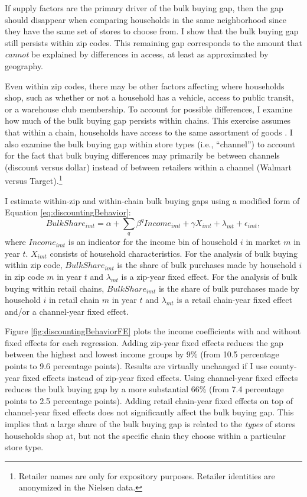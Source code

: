 \documentclass[AER]{AEA_mal}
\begin{document}
If supply factors are the primary driver of the bulk buying gap, then the gap should disappear when comparing households in the same neighborhood since they have the same set of stores to choose from. I show that the bulk buying gap still persists within zip codes. This remaining gap corresponds to the amount that \textit{cannot} be explained by differences in access, at least as approximated by geography.

Even within zip codes, there may be other factors affecting where households shop, such as whether or not a household has a vehicle, access to public transit, or a warehouse club membership. To account for possible differences, I examine how much of the bulk buying gap persists within chains. This exercise assumes that within a chain, households have access to the same assortment of goods \citep{dellavigna2019}. I also examine the bulk buying gap within store types (i.e., ``channel'') to account for the fact that bulk buying differences may primarily be between channels (discount versus dollar) instead of between retailers within a channel (Walmart versus Target).\footnote{Retailer names are only for expository purposes. Retailer identities are anonymized in the Nielsen data.}

I estimate within-zip and within-chain bulk buying gaps using a modified form of Equation \ref{eq:discountingBehavior}:
\begin{equation}
\label{eq:discountingBehaviorFE}
BulkShare_{imt} = \alpha + \sum_q \beta^q Income_{imt} + \gamma X_{imt} + \lambda_{mt} + \epsilon_{imt},
\end{equation}
where $Income_{imt}$ is an indicator for the income bin of household $i$ in market $m$ in year $t$. $X_{imt}$ consists of household characteristics. For the analysis of bulk buying within zip code, $BulkShare_{imt}$ is the share of bulk purchases made by household $i$ in zip code $m$ in year $t$ and $\lambda_{mt}$ is a zip-year fixed effect. For the analysis of bulk buying within retail chains, $BulkShare_{imt}$ is the share of bulk purchases made by household $i$ in retail chain $m$ in year $t$ and $\lambda_{mt}$ is a retail chain-year fixed effect and/or a channel-year fixed effect.

Figure \ref{fig:discountingBehaviorFE} plots the income coefficients with and without fixed effects for each regression. Adding zip-year fixed effects reduces the gap between the highest and lowest income groups by 9\% (from 10.5 percentage points to 9.6 percentage points). Results are virtually unchanged if I use county-year fixed effects instead of zip-year fixed effects. Using channel-year fixed effects reduces the bulk buying gap by a more substantial 66\% (from 7.4 percentage points to 2.5 percentage points). Adding retail chain-year fixed effects on top of channel-year fixed effects does not significantly affect the bulk buying gap. This implies that a large share of the bulk buying gap is related to the \textit{types} of stores households shop at, but not the specific chain they choose within a particular store type.
\end{document}
